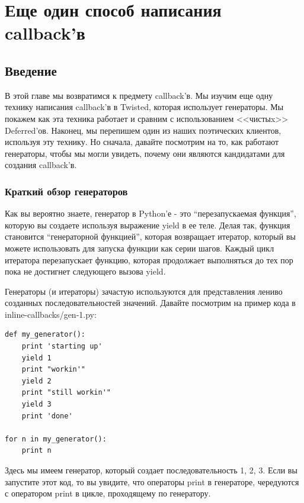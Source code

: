 
\section{Еще один способ написания callback'в\label{sec:part17}}

\subsection{Введение}


В этой главе мы возвратимся к предмету callback'в. Мы изучим 
еще одну технику написания callback'в в Twisted, которая использует 
генераторы. Мы покажем как эта техника работает и сравним с использованием 
<<чистыx>> Deferred'ов. Наконец, мы перепишем один из наших поэтических 
клиентов, используя эту технику. Но сначала, давайте посмотрим на то, 
как работают генераторы, чтобы мы могли увидеть, почему они 
являются кандидатами для создания callback'в.

\subsubsection{Краткий обзор генераторов}

Как вы вероятно знаете, генератор в Python'е - это 
``перезапускаемая функция'', которую вы создаете 
используя выражение yield в ее теле. 
Делая так, функция становится ``генераторной функцией'', 
которая возвращает итератор, который вы можете использовать 
для запуска функции как серии шагов. Каждый цикл 
итератора перезапускает функцию, которая 
продолжает выполняться до тех пор пока не достигнет 
следующего вызова yield.


Генераторы (и итераторы) зачастую используются для представления 
лениво созданных последовательностей значений. Давайте посмотрим 
на пример кода в inline-callbacks/gen-1.py:

\begin{scriptsize}\begin{verbatim}
def my_generator():
    print 'starting up'
    yield 1
    print "workin'"
    yield 2
    print "still workin'"
    yield 3
    print 'done'

for n in my_generator():
    print n
\end{verbatim}\end{scriptsize}


Здесь мы имеем генератор, который создает последовательность 
1, 2, 3. Если вы запустите этот код, то вы увидите, что операторы print в 
генераторе, чередуются с оператором print в цикле, 
проходящему по генератору.


